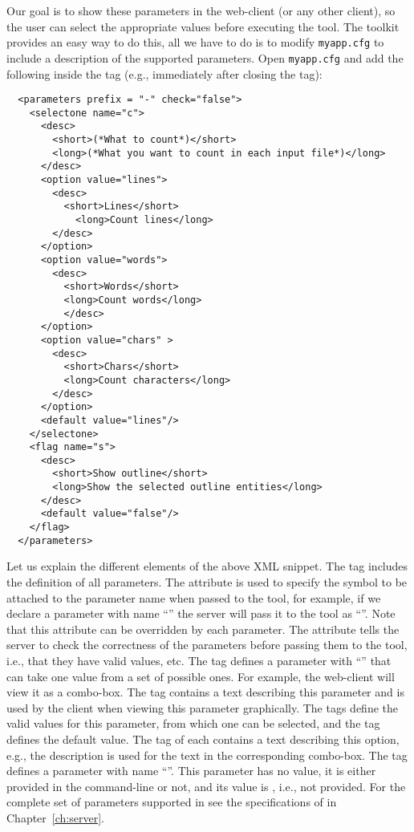 Our goal is to show these parameters in the web-client (or any other
client), so the user can select the appropriate values before
executing the tool. The \ei toolkit provides an easy way to do this,
all we have to do is to modify \texttt{myapp.cfg} to include a
description of the supported parameters. Open \texttt{myapp.cfg} and
add the following inside the  tag (e.g., immediately after
closing the  tag):

\medskip
\begin{lstlisting}
  <parameters prefix = "-" check="false">
    <selectone name="c">
      <desc>
        <short>(*What to count*)</short>
        <long>(*What you want to count in each input file*)</long>
      </desc>
      <option value="lines">
        <desc>
          <short>Lines</short>
            <long>Count lines</long>
        </desc>
      </option>
      <option value="words">
        <desc>
          <short>Words</short>
          <long>Count words</long>
          </desc>
      </option>
      <option value="chars" >
        <desc>
          <short>Chars</short>
          <long>Count characters</long>
        </desc>
      </option>
      <default value="lines"/>
    </selectone>
    <flag name="s">
      <desc>
        <short>Show outline</short>
        <long>Show the selected outline entities</long>
      </desc>
      <default value="false"/>
    </flag>
  </parameters>
\end{lstlisting}

\medskip
\noindent
Let us explain the different elements of the above XML snippet. 
%
The tag  includes the definition of all
parameters. The attribute  is used to specify the symbol
to be attached to the parameter name when passed to the tool, for
example, if we declare a parameter with name ``'' the server
will pass it to the tool as ``''. Note that this attribute can
be overridden by each parameter.
%
The attribute  tells the server to check the correctness of
the parameters before passing them to the tool, i.e., that they
have valid values, etc.
%
The tag  defines a parameter with 
``'' that can take one value from a set of possible ones. For
example, the web-client will view it as a combo-box.
%
The  tag contains a text describing this parameter and is
used by the client when viewing this parameter graphically.
%
The  tags define the valid values for this parameter, from
which one can be selected, and the  tag defines the
default value.  The  tag of each  contains a
text describing this option, e.g., the  description is used
for the text in the corresponding combo-box.
%
The tag  defines a parameter with name ``''. This
parameter has no value, it is either provided in the command-line or
not, and its  value is , i.e., not
provided. For the complete set of parameters supported in \ei see the
specifications of  in
Chapter~\ref{ch:server}.

